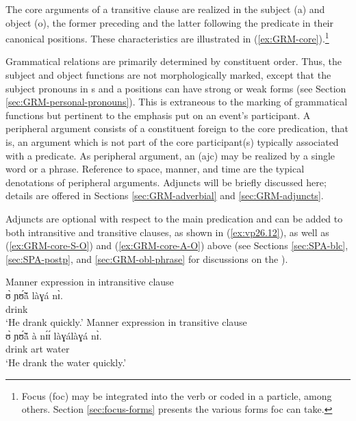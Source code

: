 The core arguments of a transitive clause are realized
in the subject ({\sc a}) and object ({\sc o}), the former preceding and the
latter following the predicate in their canonical positions. These
characteristics are illustrated in 
(\ref{ex:GRM-core}).\footnote{Focus ({\sc foc}) may be 
integrated into the verb or coded in a  particle, among others.  Section 
\ref{sec:focus-forms} presents  the
various forms {\sc foc} can take.}







Grammatical relations are primarily determined by
constituent order. Thus, the subject and object functions are not
morphologically
marked,  except that the subject pronouns in {\sc s} and {\sc a} positions  can 
have  strong or  weak forms (see Section \ref{sec:GRM-personal-pronouns}). This
is extraneous to the marking of grammatical functions but pertinent to the
emphasis put on  an  event's participant. A peripheral argument  consists of a
constituent foreign to the core predication, that is, an argument which is not
part of the core participant(s) typically associated with a predicate.  As peripheral argument,  an    ({\sc ajc}) may be realized by a single 
word or a phrase. Reference to space, manner, and time are the typical  
denotations of peripheral arguments.  Adjuncts will be briefly discussed here;  details are offered in Sections \ref{sec:GRM-adverbial} and \ref{sec:GRM-adjuncts}.  
 
 Adjuncts are optional with respect to the main predication and can be added to both intransitive and 
transitive clauses, as shown in  (\ref{ex:vp26.12}), as well as (\ref{ex:GRM-core-S-O}) 
and (\ref{ex:GRM-core-A-O}) above (see Sections \ref{sec:SPA-blc}, 
\ref{sec:SPA-postp},  and \ref{sec:GRM-obl-phrase} for  discussions on the 
).

\ea

\ea\label{ex:vp26.12}{\rm Manner expression  in intransitive clause}\\
\gll ʊ̀ ɲʊ̃́ã́ làɣá nɪ̀.\\
   {\psg} drink {\ideo} {\postp}\\
\glt  `He drank quickly.' 
% 
\ex\label{ex:vp26.13.}{\rm  Manner expression in transitive clause}\\
\gll ʊ̀ ɲʊ̃́ã́ à nɪ́ɪ́  làɣálàɣá nɪ̀.\\
   {\psg} drink {\sc art} water  {\ideo} {\postp}\\
\glt  `He drank the water quickly.' 


